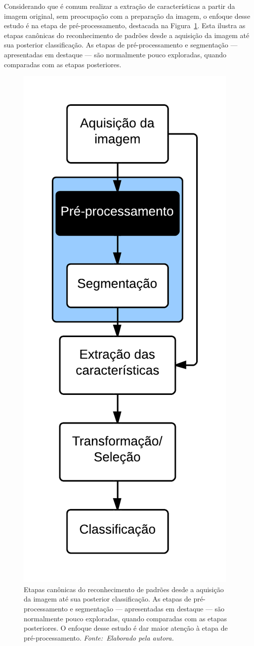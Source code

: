 Considerando que é comum realizar a extração de características a partir da imagem original, sem preocupação com a preparação da imagem, o enfoque desse estudo é na etapa de pré-processamento, destacada na Figura~\ref{fig:etapascanonicas}. Esta ilustra as etapas canônicas do reconhecimento de padrões desde a aquisição da imagem até sua posterior classificação. As etapas de pré-processamento e segmentação --- apresentadas em destaque --- são normalmente pouco exploradas, quando comparadas com as etapas posteriores.


\begin{figure}[!htbp]
 \begin{center}
   \includegraphics[width=0.3\linewidth]{figuras/flow.png}
 \end{center}
 \caption[Etapas canônicas do reconhecimento de padrões desde a aquisição da imagem até sua posterior classificação.]{Etapas canônicas do reconhecimento de padrões desde a aquisição da imagem até sua posterior classificação. As etapas de pré-processamento e segmentação --- apresentadas em destaque --- são normalmente pouco exploradas, quando comparadas com as etapas posteriores. O enfoque desse estudo é dar maior atenção à etapa de pré-processamento. \textit{Fonte:~Elaborado pela autora.}}
 \label{fig:etapascanonicas}
\end{figure}

\enlargethispage{-\baselineskip}


